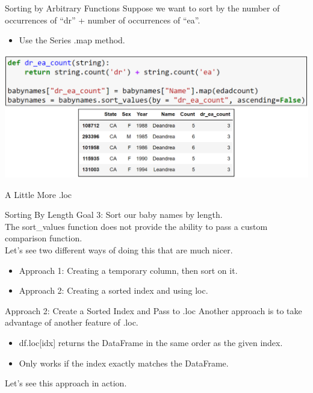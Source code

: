 \documentclass[aspectratio=169]{../latex_main/tntbeamer}  %
\begin{document}
	
	\begin{frame}[c]{Sorting by Arbitrary Functions}
       Suppose we want to sort by the number of occurrences of “dr” + number of occurrences of “ea”.
        \begin{itemize}
            \item Use the Series .map method.
        \end{itemize}
	   \includegraphics[scale=.37]{Bild15}\\
	\end{frame}
	
	
	\begin{frame}{A Little More .loc}
	    
	\end{frame}
	
	
	
	\begin{frame}[c]{Sorting By Length}
        Goal 3: Sort our baby names by length. \\
        The sort\_values function does not provide the ability to pass a custom comparison function.\\
        Let’s see two different ways of doing this that are much nicer.

        \begin{itemize}
            \item Approach 1: Creating a temporary column, then sort on it.
            \item Approach 2: Creating a sorted index and using loc.
        \end{itemize}
	\end{frame}
	
	
	\begin{frame}[c]{Approach 2: Create a Sorted Index and Pass to .loc}
        Another approach is to take advantage of another feature of .loc.

        \begin{itemize}
            \item df.loc[idx] returns the DataFrame in the same order as the given index.
            \item Only works if the index exactly matches the DataFrame.

        \end{itemize}
        Let’s see this approach in action.
	\end{frame}
	
\end{document}
